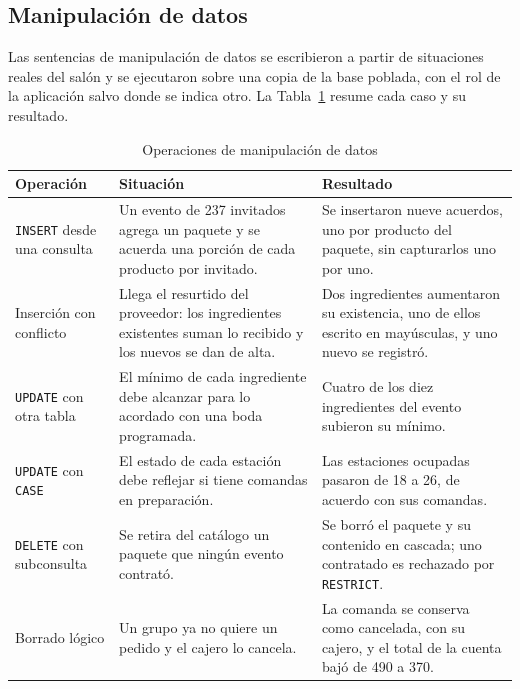 \subsection{Manipulación de datos}

Las sentencias de manipulación de datos se escribieron a partir de situaciones reales del salón y se ejecutaron sobre una copia de la base poblada, con el rol de la aplicación salvo donde se indica otro. La Tabla~\ref{tab:dml} resume cada caso y su resultado.

\begin{table}[H]
    \centering
    \small
    \begin{tabularx}{\textwidth}
        {
            >{\RaggedRight\arraybackslash}p{3.3cm}
            >{\RaggedRight\arraybackslash}X
            >{\RaggedRight\arraybackslash}X
        }
        \toprule
        \textbf{Operación} & \textbf{Situación} & \textbf{Resultado} \\
        \midrule
        \texttt{INSERT} desde una consulta & Un evento de 237 invitados agrega un paquete y se acuerda una porción de cada producto por invitado. & Se insertaron nueve acuerdos, uno por producto del paquete, sin capturarlos uno por uno. \\
        Inserción con conflicto & Llega el resurtido del proveedor: los ingredientes existentes suman lo recibido y los nuevos se dan de alta. & Dos ingredientes aumentaron su existencia, uno de ellos escrito en mayúsculas, y uno nuevo se registró. \\
        \texttt{UPDATE} con otra tabla & El mínimo de cada ingrediente debe alcanzar para lo acordado con una boda programada. & Cuatro de los diez ingredientes del evento subieron su mínimo. \\
        \texttt{UPDATE} con \texttt{CASE} & El estado de cada estación debe reflejar si tiene comandas en preparación. & Las estaciones ocupadas pasaron de 18 a 26, de acuerdo con sus comandas. \\
        \texttt{DELETE} con subconsulta & Se retira del catálogo un paquete que ningún evento contrató. & Se borró el paquete y su contenido en cascada; uno contratado es rechazado por \texttt{RESTRICT}. \\
        Borrado lógico & Un grupo ya no quiere un pedido y el cajero lo cancela. & La comanda se conserva como cancelada, con su cajero, y el total de la cuenta bajó de 490 a 370. \\
        \bottomrule
    \end{tabularx}
    \captionsetup{labelfont=bf, textfont=it, labelsep=newline, justification=raggedright, singlelinecheck=false}
    \caption{Operaciones de manipulación de datos}
    \label{tab:dml}
\end{table}

